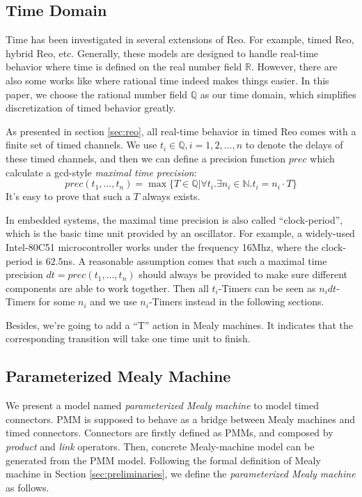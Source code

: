 \documentclass[conference, a4paper]{IEEEtran}
\begin{document}
\subsection{Time Domain}
Time has been investigated in several extensions of Reo. For example, timed
Reo\cite{DBLP:conf/sefm/ArbabBBR04, DBLP:conf/fmoods/MengA07}, hybrid Reo\cite{DBLP:conf/icfem/ChenSS14}, etc.
Generally, these models are designed to handle real-time behavior where time is defined on the
real number field $\mathbb{R}$. However, there are also some works like
\cite{DBLP:journals/fmsd/PrabhakarDM015} where
rational time indeed  makes things easier. In this paper, we choose the rational number field
$\mathbb{Q}$ as our time domain, which simplifies discretization of timed behavior greatly.

As presented in section \ref{sec:reo}, all real-time behavior in timed Reo comes with a finite set
of timed channels. We use
$t_i\in\mathbb{Q}, i=1,2,\dots,n$ to denote the delays of these timed channels, and then we can define a precision
function $prec$ which calculate a gcd-style \emph{maximal time precision}:
\[
prec(t_1,\dots,t_n) = \max\{T\in\mathbb{Q}|\forall t_i.\exists n_i\in\mathbb{N}.t_i=n_i\cdot T\}
\]
It's easy to prove that such a $T$ always exists.

In embedded systems, the maximal time precision is also called ``clock-period'', which is the basic
time unit provided by an oscillator. For example, a widely-used Intel-80C51 microcontroller works
under the frequency 16Mhz, where the clock-period is $62.5$ns. A reasonable assumption comes that
such a maximal time precision $dt=prec(t_1,\dots,t_n)$ should always be provided to make sure
different components are able to work together. Then all $t_i$-Timers can be seen as $n_idt$-Timers
for some $n_i$ and we use $n_i$-Timers instead in the following sections.

Besides, we're going to add a ``T'' action in Mealy machines. It indicates that the corresponding
transition will take one time unit to finish.

\subsection{Parameterized Mealy Machine}
We present a model named \emph{parameterized Mealy machine} to model timed connectors. PMM is
supposed to behave as a bridge between Mealy machines and timed connectors. Connectors are firstly
defined as PMMs, and composed by \emph{product} and \emph{link} operators. Then, concrete
Mealy-machine model can be generated from the PMM model.
Following the formal definition of Mealy machine in Section \ref{sec:preliminaries}, we define the
\emph{parameterized Mealy machine} as follows. 
\end{document}
